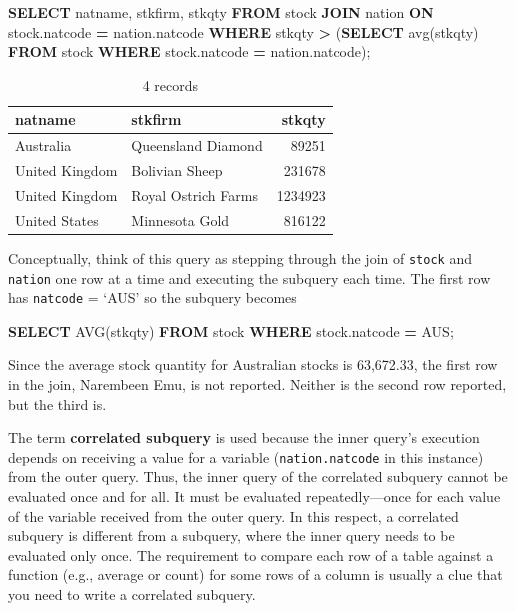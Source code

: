 \documentclass[
]{article}
\newenvironment{Shaded}{\begin{snugshade}}{\end{snugshade}}
\newcommand{\FunctionTok}[1]{\textcolor[rgb]{0.00,0.00,0.00}{#1}}
\newcommand{\KeywordTok}[1]{\textcolor[rgb]{0.13,0.29,0.53}{\textbf{#1}}}
\newcommand{\NormalTok}[1]{#1}
\newcommand{\OperatorTok}[1]{\textcolor[rgb]{0.81,0.36,0.00}{\textbf{#1}}}
\newcommand{\StringTok}[1]{\textcolor[rgb]{0.31,0.60,0.02}{#1}}
\begin{document}
\begin{Shaded}
\begin{Highlighting}[]
\KeywordTok{SELECT}\NormalTok{ natname, stkfirm, stkqty }\KeywordTok{FROM}\NormalTok{ stock }\KeywordTok{JOIN}\NormalTok{ nation}
    \KeywordTok{ON}\NormalTok{ stock.natcode }\OperatorTok{=}\NormalTok{ nation.natcode}
    \KeywordTok{WHERE}\NormalTok{ stkqty }\OperatorTok{\textgreater{}} 
\NormalTok{        (}\KeywordTok{SELECT} \FunctionTok{avg}\NormalTok{(stkqty) }\KeywordTok{FROM}\NormalTok{ stock}
            \KeywordTok{WHERE}\NormalTok{ stock.natcode }\OperatorTok{=}\NormalTok{ nation.natcode);}
\end{Highlighting}
\end{Shaded}

\begin{table}

\caption{\label{tab:unnamed-chunk-55}4 records}
\centering
\begin{tabular}[t]{l|l|r}
\hline
natname & stkfirm & stkqty\\
\hline
Australia & Queensland Diamond & 89251\\
\hline
United Kingdom & Bolivian Sheep & 231678\\
\hline
United Kingdom & Royal Ostrich Farms & 1234923\\
\hline
United States & Minnesota Gold & 816122\\
\hline
\end{tabular}
\end{table}

Conceptually, think of this query as stepping through the join of
\texttt{stock} and \texttt{nation} one row at a time and executing the subquery each
time. The first row has \texttt{natcode} = `AUS' so the subquery becomes

\begin{Shaded}
\begin{Highlighting}[]
\KeywordTok{SELECT} \FunctionTok{AVG}\NormalTok{(stkqty) }\KeywordTok{FROM}\NormalTok{ stock}
    \KeywordTok{WHERE}\NormalTok{ stock.natcode }\OperatorTok{=} \StringTok{\textquotesingle{}AUS\textquotesingle{}}\NormalTok{;}
\end{Highlighting}
\end{Shaded}

Since the average stock quantity for Australian stocks is 63,672.33, the
first row in the join, Narembeen Emu, is not reported. Neither is the
second row reported, but the third is.

The term \textbf{correlated subquery} is used because the inner query's
execution depends on receiving a value for a variable (\texttt{nation.natcode}
in this instance) from the outer query. Thus, the inner query of the
correlated subquery cannot be evaluated once and for all. It must be
evaluated repeatedly---once for each value of the variable received from
the outer query. In this respect, a correlated subquery is different
from a subquery, where the inner query needs to be evaluated only once.
The requirement to compare each row of a table against a function (e.g.,
average or count) for some rows of a column is usually a clue that you
need to write a correlated subquery.
\end{document}
